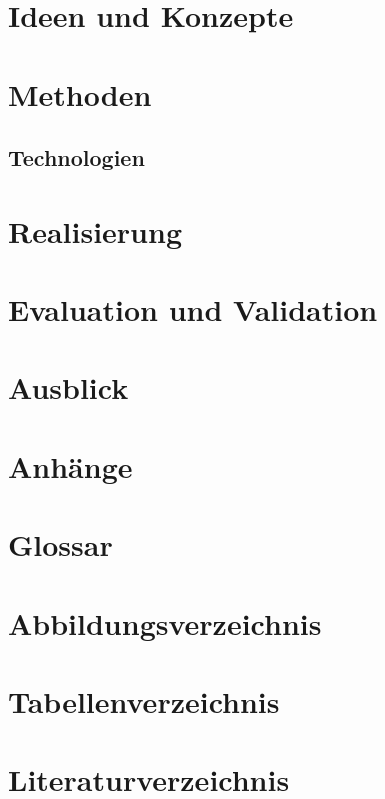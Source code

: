 \documentclass[a4paper]{article}
\begin{document}

\section{Ideen und Konzepte}


\section{Methoden}


\subsection{Technologien}


\section{Realisierung}


\section{Evaluation und Validation}


\section{Ausblick}


\newpage

\section{Anhänge}


\section{Glossar}


\section{Abbildungsverzeichnis}
\listoffigures

\section{Tabellenverzeichnis}
\listoftables

\section{Literaturverzeichnis}
\printbibliography
\end{document}
